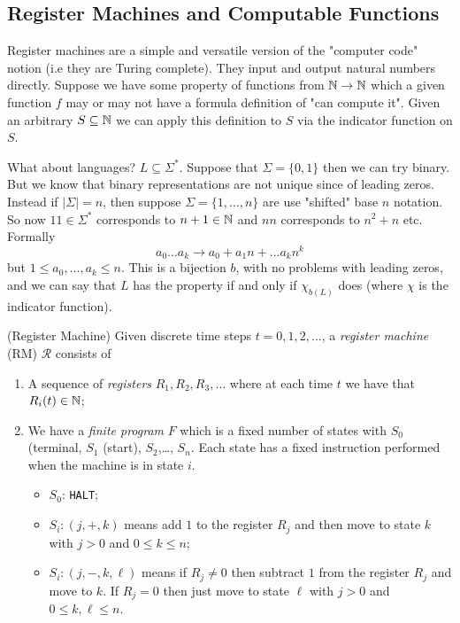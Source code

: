 \documentclass[tikx, border = 10pt]{article}
\begin{document}
\subsection{Register Machines and Computable Functions}
Register machines are a simple and versatile version of the "computer code" notion (i.e they are Turing complete). They input and output natural numbers directly. Suppose we have some property of functions from $ \mathbb{N} \to \mathbb{N} $ which a given function $ f $ may or may not have a formula definition of "can compute it". Given an arbitrary $ S\subseteq \mathbb{N} $ we can apply this definition to $ S $ via the indicator function on $ S $.\par
What about languages? $ L\subseteq \Sigma^* $. Suppose that $ \Sigma = \{0,1\} $ then we can try binary. But we know that binary representations are not unique since of leading zeros. Instead if $ |\Sigma| = n $, then suppose $ \Sigma = \{1,\dots, n\} $ are use "shifted" base $ n $ notation. So now $ 11 \in \Sigma^* $ corresponds to $ n+1\in \mathbb{N} $ and $ nn $ corresponds to $ n^2+n $ etc. Formally
\[
  a_0\dots a_k \to a_0 + a_1n + \dots a_k n^k
\]
but $ 1\le a_0,\dots, a_k\le n $. This is a bijection $ b $, with no problems with leading zeros, and we can say that $ L $ has the property if and only if $ \chi_{b(L)} $ does (where $ \chi $ is the indicator function).
\begin{definition}
	(Register Machine) Given discrete time steps $ t=0,1,2,\dots $, a \textit{register machine} (RM) $ \mathcal R $ consists of
	\begin{enumerate}
		\item A sequence of \textit{registers} $ R_1,R_2,R_3,\dots $ where at each time $ t $ we have that $ R_i(t) \in \mathbb{N} $;
		\item We have a \textit{finite program} $ F $ which is a fixed number of states with $ S_0 $ (terminal, $ S_1 $ (start), $ S_2 $,\dots, $ S_n $. Each state has a fixed instruction performed when the machine is in state $ i $.
			\begin{itemize}
				\item $ S_0 $: \verb-HALT-;
				\item $ S_i: (j,+,k) $ means add $ 1 $ to the register $ R_j $ and then move to state $ k $ with $ j>0 $ and $ 0\le k \le n $;
				\item $ S_i: (j,-,k,\ell) $ means if $ R_j \ne 0 $ then subtract $ 1 $ from the register $ R_j $ and move to $ k $. If $ R_j = 0 $ then just move to state $ \ell $ with $ j>0 $ and $ 0\le k,\ell \le n $.
			\end{itemize}
	\end{enumerate}
\end{definition}
\end{document}
